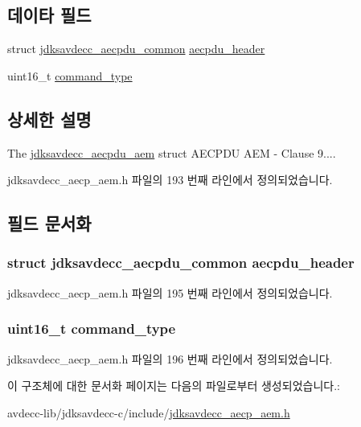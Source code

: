 \subsection*{데이타 필드}
\begin{DoxyCompactItemize}
\item 
struct \hyperlink{structjdksavdecc__aecpdu__common}{jdksavdecc\+\_\+aecpdu\+\_\+common} \hyperlink{structjdksavdecc__aecpdu__aem_ae8460ae179666e7ce268ed1ef33d0de3}{aecpdu\+\_\+header}
\item 
uint16\+\_\+t \hyperlink{structjdksavdecc__aecpdu__aem_a07f7ee802870e9ae75f021832f59a8a9}{command\+\_\+type}
\end{DoxyCompactItemize}


\subsection{상세한 설명}
The \hyperlink{structjdksavdecc__aecpdu__aem}{jdksavdecc\+\_\+aecpdu\+\_\+aem} struct A\+E\+C\+P\+DU A\+EM -\/ Clause 9.... 

jdksavdecc\+\_\+aecp\+\_\+aem.\+h 파일의 193 번째 라인에서 정의되었습니다.



\subsection{필드 문서화}
\subsubsection[{\texorpdfstring{aecpdu\+\_\+header}{aecpdu_header}}]{\setlength{\rightskip}{0pt plus 5cm}struct {\bf jdksavdecc\+\_\+aecpdu\+\_\+common} aecpdu\+\_\+header}\hypertarget{structjdksavdecc__aecpdu__aem_ae8460ae179666e7ce268ed1ef33d0de3}{}\label{structjdksavdecc__aecpdu__aem_ae8460ae179666e7ce268ed1ef33d0de3}


jdksavdecc\+\_\+aecp\+\_\+aem.\+h 파일의 195 번째 라인에서 정의되었습니다.

\subsubsection[{\texorpdfstring{command\+\_\+type}{command_type}}]{\setlength{\rightskip}{0pt plus 5cm}uint16\+\_\+t command\+\_\+type}\hypertarget{structjdksavdecc__aecpdu__aem_a07f7ee802870e9ae75f021832f59a8a9}{}\label{structjdksavdecc__aecpdu__aem_a07f7ee802870e9ae75f021832f59a8a9}


jdksavdecc\+\_\+aecp\+\_\+aem.\+h 파일의 196 번째 라인에서 정의되었습니다.



이 구조체에 대한 문서화 페이지는 다음의 파일로부터 생성되었습니다.\+:\begin{DoxyCompactItemize}
\item 
avdecc-\/lib/jdksavdecc-\/c/include/\hyperlink{jdksavdecc__aecp__aem_8h}{jdksavdecc\+\_\+aecp\+\_\+aem.\+h}\end{DoxyCompactItemize}
